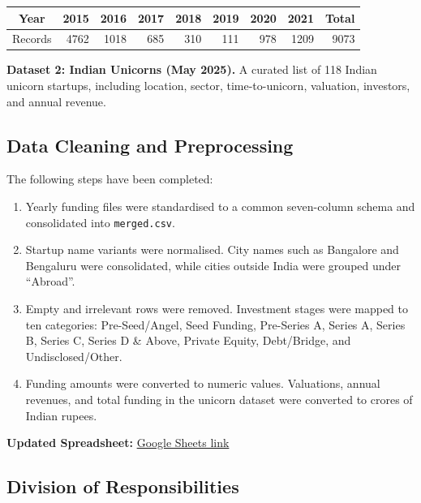 \documentclass[10pt,a4paper]{article}
\begin{document}
\begin{center}
\small
{}
\begin{tabular}{c|rrrrrrr|r}
\toprule
\textbf{Year}
& 2015 & 2016 & 2017 & 2018 & 2019 & 2020 & 2021
& \textbf{Total}\\
\midrule
Records
& 4762 & 1018 & 685 & 310 & 111 & 978 & 1209
& 9073\\
\bottomrule
\end{tabular}
\end{center}

\textbf{Dataset 2: Indian Unicorns (May 2025).}
A curated list of 118 Indian unicorn startups, including location,
sector, time-to-unicorn, valuation, investors, and annual revenue.

\subsection{Data Cleaning and Preprocessing}

The following steps have been completed:

\begin{enumerate}
    \item Yearly funding files were standardised to a common
    seven-column schema and consolidated into \texttt{merged.csv}.

    \item Startup name variants were normalised. City names such as
    Bangalore and Bengaluru were consolidated, while cities outside
    India were grouped under ``Abroad''.

    \item Empty and irrelevant rows were removed. Investment stages
    were mapped to ten categories: Pre-Seed/Angel, Seed Funding,
    Pre-Series A, Series A, Series B, Series C, Series D \& Above,
    Private Equity, Debt/Bridge, and Undisclosed/Other.

    \item Funding amounts were converted to numeric values.
    Valuations, annual revenues, and total funding in the unicorn
    dataset were converted to crores of Indian rupees.
\end{enumerate}

\textbf{Updated Spreadsheet:}
\href{https://docs.google.com/spreadsheets/d/1rOHg7PRTUyQhNcKS4sHRMWOS8t5IsXoPo_IaoyhDdhA/edit?gid=0}{Google Sheets link}

\subsection{Division of Responsibilities}
\end{document}
